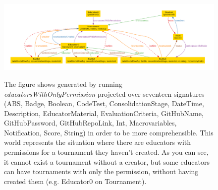 \begin{figure}[h]
\centering
\includegraphics[width=1\linewidth]{4Alloy/res/educatorsWithOnlyPermission.pdf}
\label{fig:educatorsWithOnlyPermission_alloy}
\caption{The figure shows generated by running \textit{educatorsWithOnlyPermission} projected over seventeen signatures (ABS, Badge, Boolean, CodeTest, ConsolidationStage, DateTime, Description, EducatorMaterial, EvaluationCriteria, GitHubName, GitHubPassword, GitHubRepoLink, Int, Macrovariables, Notification, Score, String) in order to be more comprehensible. This world represents the situation where there are educators with permissions for a tournament they haven't created. As you can see, it cannot exist a tournament without a creator, but some educators can have tournaments with only the permission, without having created them (e.g. Educator0 on Tournament).}
\end{figure}



